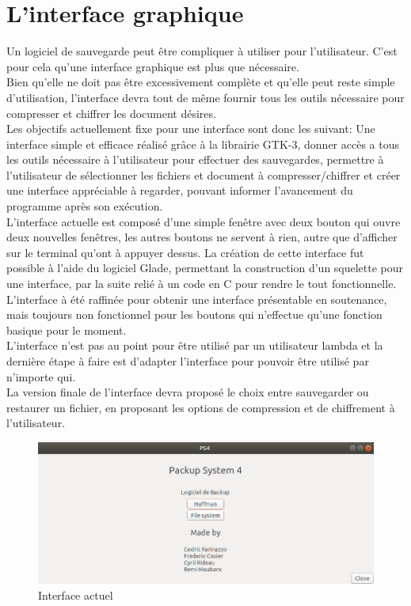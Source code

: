 \section{L'interface graphique}
    Un logiciel de sauvegarde peut être compliquer à utiliser pour l'utilisateur. C'est pour cela qu'une interface graphique est plus que nécessaire. \\
    Bien qu'elle ne doit pas être excessivement complète et qu'elle peut reste simple d'utilisation, l'interface devra tout de même fournir tous les outils nécessaire pour compresser et chiffrer les document désires. \\
    Les objectifs actuellement fixe pour une interface sont donc les suivant: Une interface simple et efficace réalisé grâce à la librairie GTK-3, donner accès a tous les outils nécessaire à l'utilisateur pour effectuer des sauvegardes, permettre à l'utilisateur de sélectionner les fichiers et document à compresser/chiffrer et créer une interface appréciable à regarder, pouvant informer l'avancement du programme après son exécution. \\
    
    L'interface actuelle est composé d'une simple fenêtre avec deux bouton qui ouvre deux nouvelles fenêtres, les autres boutons ne servent à rien, autre que d'afficher sur le terminal qu'ont à appuyer dessus. La création de cette interface fut possible à l'aide du logiciel Glade, permettant la construction d'un squelette pour une interface, par la suite relié à un code en C pour rendre le tout fonctionnelle. L'interface à été raffinée pour obtenir une interface présentable en soutenance, mais toujours non fonctionnel pour les boutons qui n'effectue qu'une fonction basique pour le moment. \\
    L'interface n'est pas au point pour être utilisé par un utilisateur lambda et la dernière étape à faire est d'adapter l'interface pour pouvoir être utilisé par n'importe qui. \\
    La version finale de l'interface devra proposé le choix entre sauvegarder ou restaurer un fichier, en proposant les options de compression et de chiffrement à l'utilisateur. 
    
	\begin{figure}[!h]
		\centering
		\includegraphics[width=13.1cm]{images/gui-screen.png}
		\caption{Interface actuel}
		\label{Interface actuel}
	\end{figure}
	
